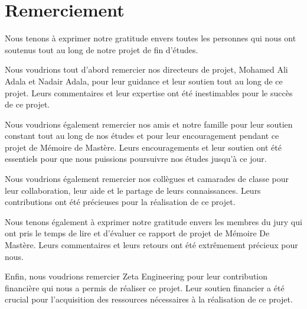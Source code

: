 \chapter*{Remerciement }

\setlength{\parskip}{5mm}
\setlength{\parindent}{1cm}


\large{
Nous tenons à exprimer notre gratitude envers toutes les personnes qui nous ont soutenus tout au long de notre projet de fin d'études.

Nous voudrions tout d'abord remercier nos directeurs de projet, Mohamed Ali Adala et Nadair Adala, pour leur guidance et leur soutien tout au long de ce projet. Leurs commentaires et leur expertise ont été inestimables pour le succès de ce projet.

Nous voudrions également remercier nos amis et notre famille pour leur soutien constant tout au long de nos études et pour leur encouragement pendant ce projet de Mémoire de Mastère. Leurs encouragements et leur soutien ont été essentiels pour que nous puissions poursuivre nos études jusqu'à ce jour.

Nous voudrions également remercier nos collègues et camarades de classe pour leur collaboration, leur aide et le partage de leurs connaissances. Leurs contributions ont été précieuses pour la réalisation de ce projet.

Nous tenons également à exprimer notre gratitude envers les membres du jury qui ont pris le temps de lire et d'évaluer ce rapport de projet de Mémoire De Mastère. Leurs commentaires et leurs retours ont été extrêmement précieux pour nous.

Enfin, nous voudrions remercier Zeta Engineering pour leur contribution financière qui nous a permis de réaliser ce projet. Leur soutien financier a été crucial pour l'acquisition des ressources nécessaires à la réalisation de ce projet.}